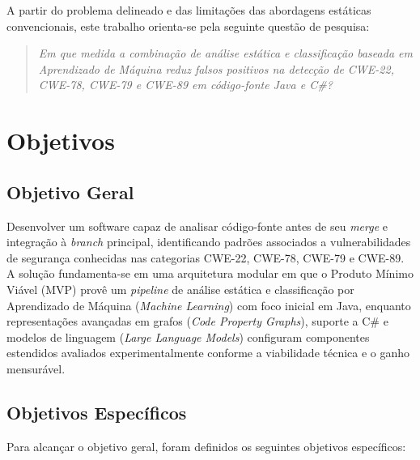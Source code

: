 A partir do problema delineado e das limitações das abordagens estáticas convencionais, este trabalho orienta-se pela seguinte questão de pesquisa:

\begin{quote}
\textit{Em que medida a combinação de análise estática e classificação baseada em Aprendizado de Máquina reduz falsos positivos na detecção de CWE-22, CWE-78, CWE-79 e CWE-89 em código-fonte Java e C\#?}
\end{quote}

\section{Objetivos}

\subsection{Objetivo Geral}

Desenvolver um software capaz de analisar código-fonte antes de seu \textit{merge} e integração à \textit{branch} principal, identificando padrões associados a vulnerabilidades de segurança conhecidas nas categorias CWE-22, CWE-78, CWE-79 e CWE-89. A solução fundamenta-se em uma arquitetura modular em que o Produto Mínimo Viável (MVP) provê um \textit{pipeline} de análise estática e classificação por Aprendizado de Máquina (\textit{Machine Learning}) com foco inicial em Java, enquanto representações avançadas em grafos (\textit{Code Property Graphs}), suporte a C\# e modelos de linguagem (\textit{Large Language Models}) configuram componentes estendidos avaliados experimentalmente conforme a viabilidade técnica e o ganho mensurável.

\subsection{Objetivos Específicos}

Para alcançar o objetivo geral, foram definidos os seguintes objetivos específicos:

